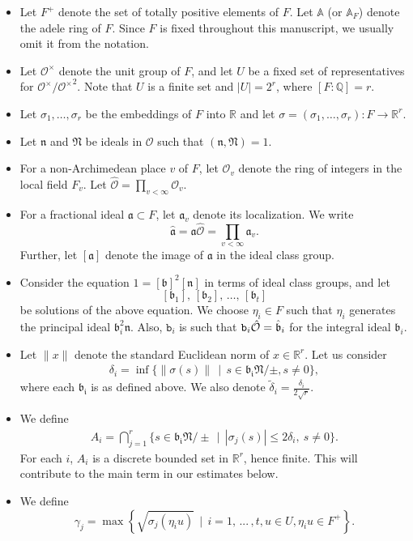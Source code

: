 \documentclass[reqno]{amsart}
\theoremstyle{plain}
\theoremstyle{definition}
\theoremstyle{remark}
\def\Q{\mathbb{Q}}
\def\A{\mathbbm A}
\def\R{\mathbb R}
\def\b{\mathtt b}
\def\Q{\mathbb Q}
\def\R{\mathbb R}
\def\A{\mathbb A}
\begin{document}
\begin{itemize}
\item Let $F^{+}$ denote the set of totally positive elements of $F$. Let $\A$ (or $\A_F$) denote the adele ring of $F$. Since $F$ is fixed throughout this manuscript, we usually omit it from the notation.
\item Let $\mathcal{O}^\times$ denote the unit group of $F$, and let $U$ be a fixed set of representatives for $\mathcal{O}^\times/{\mathcal{O}^\times}^2$.  Note that $U$ is a finite set and $|U| = 2^r$, where $[F:\Q]=r$. 
\item Let $\sigma_1, \dots, \sigma_r$ be the embeddings of $F$ into $\R$ and let $\sigma = (\sigma_1, \dots, \sigma_r) : F \to \R^r$.  
\item Let $\mathfrak{n}$ and $\mathfrak{N}$ be ideals in $\mathcal O$ such that $( \mathfrak{n}, \mathfrak{N}) = 1$.  
\item For a non-Archimedean place $v$ of $F$, let $\mathcal O_v$ denote the ring of integers in the local field $F_v$.  Let $\widehat{\mathcal O} = \prod_{v < \infty}{\mathcal O}_v.$ 
\item For a fractional ideal $\mathfrak a \subset F$, let $\mathfrak a_v$ denote its localization.  We write 
$$\widehat{\mathfrak{a}} = \mathfrak a \widehat{\mathcal O} = \prod_{v < \infty} \mathfrak a_v.$$
Further, let $[\mathfrak a]$ denote the image of $\mathfrak a$ in the ideal class group.
\item Consider the equation $1 = [\mathfrak{b}]^2[\mathfrak{n}]$ in terms of ideal class groups, and let 
$$[\mathfrak{b}_1],\,[\mathfrak{b}_2],\,\dots,\,[\mathfrak{b}_t]$$
be solutions of the above equation.   We choose $\eta_i \in F$ such that $\eta_i$ generates the principal ideal $\mathfrak{b}_i^2\mathfrak{n}$. Also, $\b_i$ is such that $\b_i \Hat{\mathcal{O}}=\Hat{\mathfrak{b}}_i$ for the  integral ideal $\mathfrak{b}_i.$ 
\item  Let $\|x\|$ denote the standard Euclidean norm of $x\in \R^r$.  Let us consider 
\begin{align}\label{delta_i}
\delta_i =\inf\{\|\sigma(s)\|  \,\mid \, s\in \mathfrak{b_i}\mathfrak{N}/\pm, s\neq 0 \},
\end{align}
where each $\mathfrak{b_i}$ is as defined above.  We also denote $\tilde{\delta}_i=\frac{\delta_i}{2\sqrt{r}}$.
\item  
We define
\begin{align}\label{A_i}
A_i=\bigcap_{j=1}^r\{  s\in \mathfrak{b_i}\mathfrak{N}/\pm \,\mid\, |\sigma_j(s)|\leq  2 \delta_i,\ s\neq 0\}.
\end{align} 
For each $i$, $A_i$ is a discrete bounded set in $\R^r$, hence finite. This will contribute to the main term in our estimates below. 
\item We define
$$\gamma_{j}=\max \left \{\sqrt{\sigma_{j}(\eta_i u)} \,\mid \,i =1,\,...\,,t  ,u\in U, \eta_i u\in F^+\right \} .$$   
\end{itemize}
\end{document}

